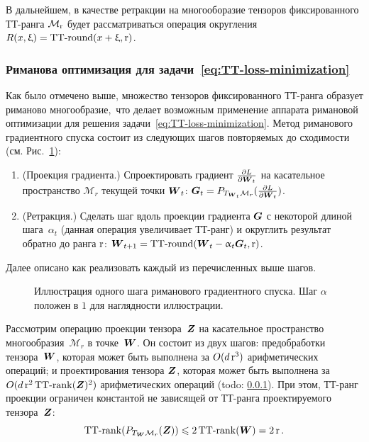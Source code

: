 В дальнейшем, в качестве ретракции на многооборазие тензоров фиксированного ТТ-ранга $\mathcal{M}_{\operatorname{r}}$ будет рассматриваться операция округления $R(x, \upxi) = \operatorname{TT-round}(x + \upxi, \operatorname{r})$.


\subsubsection{Риманова оптимизация для задачи~\eqref{eq:TT-loss-minimization} \label{sec:exm-riemannian-optimization}}

Как было отмечено выше, множество тензоров фиксированного ТТ-ранга образует риманово многообразие, что делает возможным применение аппарата римановой оптимизации для решения задачи~\eqref{eq:TT-loss-minimization}.
Метод риманового градиентного спуска состоит из следующих шагов повторяемых до сходимости (см. Рис.~\ref{fig:riemannian-illustration}):
\begin{enumerate}
\item (Проекция градиента.) Спроектировать градиент $\frac{\partial L}{\partial \boldsymbol{W}_t}$ на касательное пространство $\mathcal{M}_r$ текущей точки $\boldsymbol{W}_t$: $\boldsymbol{G}_t = P_{T_{\boldsymbol{W}_t} \mathcal{M}_r}(\frac{\partial L}{\partial \boldsymbol{W}_t})$.
\item (Ретракция.) Сделать шаг вдоль проекции градиента $\boldsymbol{G}$ с некоторой длиной шага~$\alpha_t$ (данная операция увеличивает ТТ-ранг) и округлить результат обратно до ранга $\operatorname{r}$: $\boldsymbol{W}_{t+1} = \operatorname{TT-round}(\boldsymbol{W}_t - \upalpha_t \boldsymbol{G}_t, \operatorname{r})$.
\end{enumerate}
Далее описано как реализовать каждый из перечисленных выше шагов.

\begin{figure}[t]
\begin{center}
  \resizebox{0.5\textwidth}{!}{
  \def\svgwidth{7cm}
  \normalsize
  
  }
  \caption{Иллюстрация одного шага риманового градиентного спуска. Шаг $\alpha$ положен в $1$ для наглядности иллюстрации. \label{fig:riemannian-illustration}}
  \end{center}
\end{figure}

Рассмотрим операцию проекции тензора~$\boldsymbol{Z}$ на касательное пространство многообразия~$\mathcal{M}_r$ в точке~$\boldsymbol{W}$. Он состоит из двух шагов: предобработки тензора~$\boldsymbol{W}$, которая может быть выполнена за $O(d \operatorname{r}^3)$ арифметических операций; и проектирования тензора $\boldsymbol{Z}$, которая может быть выполнена за $O(d \operatorname{r}^2 \operatorname{TT-rank}(\boldsymbol{Z})^2)$ арифметических операций (\alert{todo: \ref{}}).
При этом, ТТ-ранг проекции ограничен константой не зависящей от ТТ-ранга проектируемого тензора~$\boldsymbol{Z}$:
\begin{equation*}
   \operatorname{TT-rank}(P_{T_{\boldsymbol{W}} \mathcal{M}_r}(\boldsymbol{Z})) \leqslant 2 \operatorname{TT-rank}(\boldsymbol{W}) = 2 \operatorname{r}.
\end{equation*}

